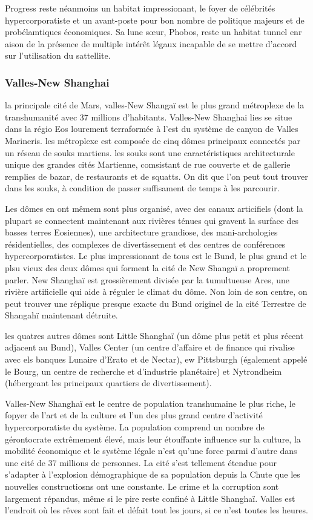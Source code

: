Progress reste néanmoins un habitat impressionant, le foyer de célébrités hypercorporatiste et un avant-poste pour bon nombre de politique majeurs et de probélamtiques économiques. Sa lune sœur, Phobos, reste un habitat tunnel enr aison de la présence de multiple intérêt légaux incapable de se mettre d'accord sur l'utilisation du sattellite. 

\subsubsection{Valles-New Shanghai} \label{sec:valles-new-shanghai} 

la principale cité de Mars, valles-New Shangaï est le plus grand métroplexe de la transhumanité avec 37 millions d'habitants. Valles-New Shanghai lies se situe dans la régio Eos lourement terraformée à l'est du système de canyon de Valles Marineris. les métroplexe est composée de cinq dômes principaux connectés par un réseau de souks martiens. les souks sont une caractéristiques architecturale unique des grandes cités Martienne, comsistant de rue couverte et de gallerie remplies de bazar, de restaurants et de squatts. On dit que l'on peut tout trouver dans les souks, à condition de passer suffisament de temps à les parcourir. 

Les dômes en ont mêmem sont plus organisé, avec des canaux articifiels (dont la plupart se connectent maintenant aux rivières ténues qui gravent la surface des basses terres Eosiennes), une architecture grandiose, des mani-archologies résidentielles, des complexes de divertissement et des centres de conférences hypercorporatistes. Le plus impressionant de tous est le Bund, le plus grand et le plsu vieux des deux dômes qui forment la cité de New Shangaï a proprement parler. New Shanghaï est grossièrement divisée par la tumultueuse Ares, une rivière artificielle qui aide à réguler le climat du dôme. Non loin de son centre, on peut trouver une réplique presque exacte du Bund originel de la cité Terrestre de Shangahï maintenant détruite. 

les quatres autres dômes sont Little Shanghaï (un dôme plus petit et plus récent adjacent au Bund), Valles Center (un centre d'affaire et de finance qui rivalise avec els banques Lunaire d'Erato et de Nectar), ew Pittsburgh (également appelé le Bourg, un centre de recherche et d'industrie planétaire) et Nytrondheim (hébergeant les principaux quartiers de divertissement). 

Valles-New Shanghaï est le centre de population transhumaine le plus riche, le fopyer de l'art et de la culture et l'un des plus grand centre d'activité hypercorporatiste du système. La population comprend un nombre de gérontocrate extrêmement élevé, mais leur étouffante influence sur la culture, la mobilité économique et le système légale n'est qu'une force parmi d'autre dans une cité de 37 millions de personnes. La cité s'est tellement étendue pour s'adapter à l'explosion démographique de sa population depuis la Chute que les nouvelles constructiosns ont une constante. Le crime et la corruption sont largement répandus, même si le pire reste confiné à Little Shanghaï. Valles est l'endroit où les rêves sont fait et défait tout les jours, si ce n'est toutes les heures. 

